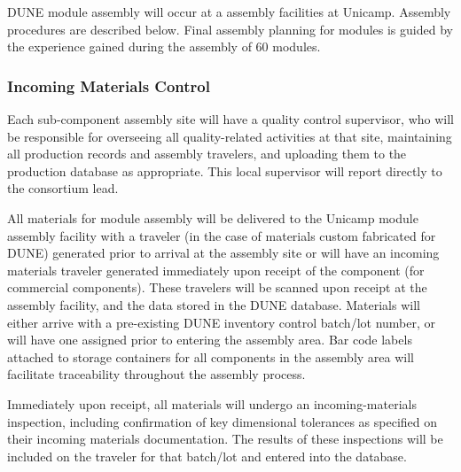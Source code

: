 DUNE   module assembly will occur at a  assembly facilities at Unicamp.  Assembly procedures are described below.  Final assembly planning for  modules is guided by the experience gained during the assembly of \num{60}   modules. 


\subsubsection{Incoming Materials Control}


Each  sub-component assembly site will have a quality control supervisor, who will be responsible for overseeing all quality-related activities at that site, maintaining all production records and assembly travelers, and uploading them to the production database as appropriate.   This local supervisor will report directly to the  consortium lead.

All materials for  module assembly will be delivered to the Unicamp module assembly facility with a  traveler (in the case of materials custom fabricated for DUNE) generated prior to arrival at the assembly site or will have an incoming materials traveler generated immediately upon receipt of the component (for commercial components).  These travelers will be scanned upon receipt at the assembly facility, and the data stored in the DUNE  database.  Materials will either arrive with a pre-existing DUNE inventory control batch/lot number, or will have one assigned prior to entering the assembly area.  Bar code labels attached to storage containers for all components in the assembly area will facilitate traceability throughout the assembly process.

Immediately upon receipt, all materials will undergo an incoming-materials inspection, including confirmation of key dimensional tolerances as specified on their incoming materials documentation. %
The results of these inspections will be included on the traveler for that batch/lot and entered into the database.

